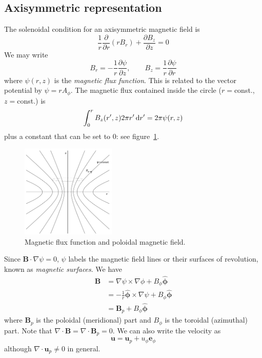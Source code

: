 \documentclass{jknotes}
\newcommand{\B}{\symbf{B}}
\renewcommand{\u}{\symbf{u}}
\begin{document}
\subsection{Axisymmetric representation}
The solenoidal condition for an axisymmetric magnetic field is
\begin{equation}
	\frac{1}{r}\frac{\partial}{\partial r}\left(rB_r\right) + \frac{\partial
	B_z}{\partial z} = 0
\end{equation}
We may write
\begin{equation}
	B_r = -\frac{1}{r}\frac{\partial \psi}{\partial z}, \hspace{2em} B_z =
	\frac{1}{r}\frac{\partial \psi}{\partial r}
\end{equation}
where $\psi(r,z)$ is the \emph{magnetic flux function}. This is related to the
vector potential by $\psi = r A_\phi$. The magnetic flux contained inside the
circle ($r =$const., $z=$const.) is
\begin{equation}
	\int_0^r B_z(r',z)2\pi r' \, \diffd r' = 2\pi \psi(r,z)
\end{equation}
plus a constant that can be set to $0$: see figure~\ref{fig:axisym_B}. 

\begin{figure}[h]
	\centering
	\includegraphics[width=0.4\textwidth]{flux_function.png}
	\caption{Magnetic flux function and poloidal magnetic field.}
	\label{fig:axisym_B}
\end{figure}

Since $\B \cdot \nabla \psi = 0$, $\psi$ labels the magnetic field lines or
their surfaces of revolution, known as \emph{magnetic surfaces}. We have
\begin{align}
	\B &= \nabla \psi \times \nabla \phi + B_\phi \hat{\symbf{\phi}} \\
	   &= -\frac{1}{r} \hat{\symbf{\phi}}\times \nabla \psi + B_\phi
	   \hat{\symbf{\phi}} \\
	   &= \B_p + B_\phi \hat{\symbf{\phi}}
\end{align}
where $\B_p$ is the poloidal (meridional) part and $B_\phi$ is the toroidal
(azimuthal) part. Note that $\nabla \cdot \B = \nabla \cdot \B_p = 0$. We can
also write the velocity as
\begin{equation}
	\u = \u_p + u_\phi \symbf{e}_\phi
\end{equation}
although $\nabla \cdot \u_p \ne 0$ in general.
\end{document}
